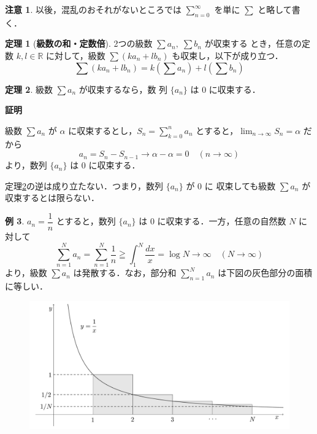 \documentclass[10pt, uplatex, dvipdfmx]{jsarticle}
\makeatletter
\renewenvironment{proof}[1][\proofname]{\par
  \pushQED{\qed}%
  \normalfont \topsep6\p@\@plus6\p@\relax
  \trivlist
  \item\relax
  {\bfseries
  #1\@addpunct{.}}\hspace\labelsep\ignorespaces
}{%
  \popQED\endtrivlist\@endpefalse
}
\theoremstyle{definition}
\newtheorem{theorem}{定理}[section]
\newtheorem{example}[theorem]{例}
\newtheorem*{remark}{注意}
\renewcommand{\proofname}{\textbf{証明}}
\numberwithin{equation}{section}
\newcommand{\ds}{\displaystyle}
\makeatother
\begin{document}
\newpage

\begin{remark}
以後，混乱のおそれがないところでは $\ds \sum_{n=0}^{\infty}$ を単に $\sum$ と略して書く．
\end{remark}

\begin{theorem}[\textbf{級数の和・定数倍}]\label{thm:linear} 2つの級数
  $\sum a_n, \; \sum b_n$ が収束する
  とき，任意の定数 $k, l \in \mathbb{R}$ に対して，級数
  $\ds \sum \left(k a_n+ lb_n\right)$ も収束し，以下が成り立つ．
  \[
    \sum \left( k a_n + l b_n\right)
    = k\left( \sum a_n\right) + l \left(\sum  b_n\right)
  \]
\end{theorem}

\begin{theorem}\label{thm:seq0}
  級数 $\ds \sum a_n$ が収束するなら，数
  列 $\{a_n\}$ は $0$ に収束する．
\end{theorem}

\begin{proof}
  級数 $\ds \sum  a_n$ が $\alpha$
  に収束するとし，$\ds S_n=\sum_{k=0}^{n}a_n$ とすると，$\ds \lim_{n \to \infty}S_n=\alpha$ だから
  \[
    a_n = S_n - S_{n-1}  \to \alpha - \alpha =0 \quad (n \to \infty)
  \]
  より，数列 $\{a_n\}$ は $0$ に収束する．
\end{proof}

定理\ref{thm:seq0}の逆は成り立たない．つまり，数列 $\{a_n\}$ が $0$ に
収束しても級数 $ \sum a_n$ が収束するとは限らない．

\begin{example}\label{exmp:harmonic}
  $a_n=\dfrac{1}{n}$ とすると，数列 $\{a_n\}$ は $0$ に収束する．一方，任意の自然数 $N$ に対して
  \[
    \sum_{n=1}^{N}a_n=\sum_{n=1}^{N} \frac{1}{n}
    \geqq \int_{1}^{N}\frac{dx}{x} = \log N \to \infty \quad (N \to \infty)
  \]
  より，級数 $\sum a_n$ は発散する．なお，部分和 $\ds \sum_{n=1}^{N} a_n$ は下図の灰色部分の面積に等しい．
  \begin{figure}[h]
    \centering
    \includegraphics[width=15cm]{./pictures/06/harmonic.pdf}
  \end{figure}
\end{example}
\end{document}
